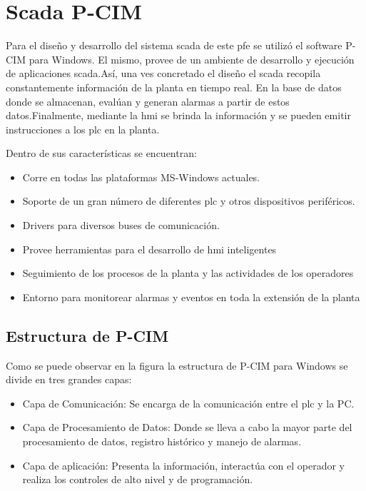 \section{Scada P-CIM}
\label{sec:ScadaPCIM} 
Para el diseño y desarrollo del sistema \gls{scada} de este \gls{pfe} se utilizó el software 
P-CIM para Windows. El mismo, provee de un ambiente de desarrollo y ejecución de aplicaciones 
\gls{scada}.Así, una ves concretado el diseño el \gls{scada} recopila constantemente información 
de la planta en tiempo real. En la base de datos donde se almacenan, evalúan y generan alarmas 
a partir de estos datos.Finalmente, mediante la \gls{hmi} se brinda la información y se pueden 
emitir instrucciones a los \gls{plc} en la planta. 

Dentro de sus características se encuentran:
\begin{itemize}
 \item Corre en todas las plataformas MS-Windows actuales.
 \item Soporte de un gran número de diferentes \gls{plc} y otros dispositivos periféricos.
 \item Drivers para diversos buses de comunicación.
 \item Provee herramientas para el desarrollo de \gls{hmi} inteligentes 
 \item Seguimiento de los procesos de la planta y las actividades de los operadores
 \item Entorno para monitorear alarmas y eventos en toda la extensión de la planta
\end{itemize}


\subsection{Estructura de P-CIM}
\label{sec:CapasPrograma}
Como se puede observar en la figura la estructura de P-CIM 
para Windows se divide en tres grandes capas:
\begin{itemize}
 \item Capa de Comunicación: Se encarga de la comunicación entre el \gls{plc} y la PC.
 \item Capa de Procesamiento de Datos: Donde se lleva a cabo la mayor parte del procesamiento 
 de datos, registro histórico y manejo de alarmas.
 \item Capa de aplicación: Presenta la información, interactúa con el operador y realiza 
 los controles de alto nivel y de programación.
\end{itemize}

